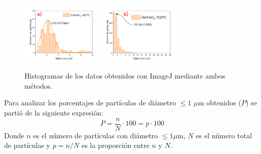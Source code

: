 \documentclass[../main.tex]{subfiles}
\begin{document}
\begin{figure}[H]
    \centering
    \includegraphics[width=0.35\textwidth]{fig/ejemplohist1.png}
    \quad
    \includegraphics[width=0.35\textwidth]{fig/ejemplohist2.png}
    \caption{Histogramas de los datos obtenidos con ImageJ mediante ambos métodos.}
    \label{fig:ejemplohist}
\end{figure}
Para analizar los porcentajes de partículas de diámetro $\leq1$ $\mu$m obtenidos ($P$) se partió de la siguiente expresión:
\begin{equation}
    P=\dfrac{n}{N}\cdot100=p\cdot100
    \label{eq:porcentajeeq}
\end{equation}
Donde $n$ es el número de partículas con diámetro $\leq 1\mu$m, $N$ es el número total de partículas y $p=n/N$ es la proporción entre $n$ y $N$.
\end{document}
